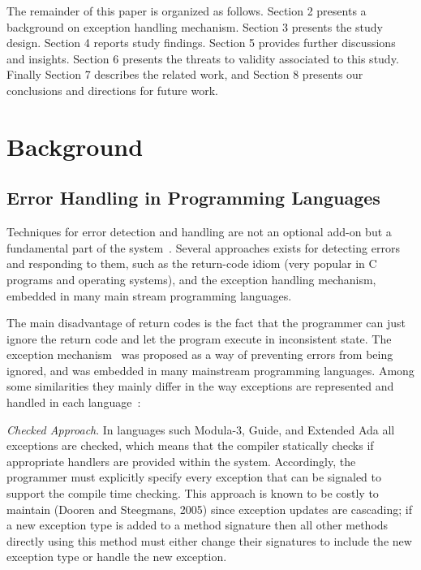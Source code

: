 \documentclass[conference]{IEEEtran}
\begin{document}
The remainder of this paper is organized as follows. Section 2 presents a
background on exception handling mechanism. Section 3 presents the study design.
Section 4 reports study findings. Section 5 provides further discussions and insights.
Section 6 presents the threats to validity associated to this study. Finally Section
7 describes the related work, and Section 8 presents our conclusions and
directions for future work.


\section{Background}

\subsection{Error Handling in Programming Languages}

Techniques for error detection and handling are not  an optional add-on but a
fundamental part of the system~\cite{bruntink2006discovering}. Several
approaches exists for detecting errors and responding to them, such as the return-code 
idiom (very popular in C programs and operating systems), and the exception handling 
mechanism, embedded in many main stream programming languages.

The main disadvantage of return codes is the fact that the programmer can just
ignore the return code and let the program execute in inconsistent state. The
exception mechanism~\cite{goodenough1975exception} was proposed as a way of
preventing errors from being ignored, and was embedded in many mainstream
programming languages. Among some similarities they mainly differ in the way
exceptions are represented and handled in each
language~\cite{garcia2001comparative}:

\noindent\emph{Checked Approach}. In languages such Modula-3, Guide, and
Extended Ada all exceptions are checked, which means that the compiler
statically checks if appropriate handlers are provided within the system.
Accordingly, the programmer must explicitly specify every exception that can be
signaled to support the compile time checking. This approach is known to be
costly to maintain (Dooren and Steegmans, 2005) since exception updates are
cascading; if a new exception type is added to a method signature then all other
methods directly using this method must either change their signatures to
include the new exception type or handle the new exception.
\end{document}
